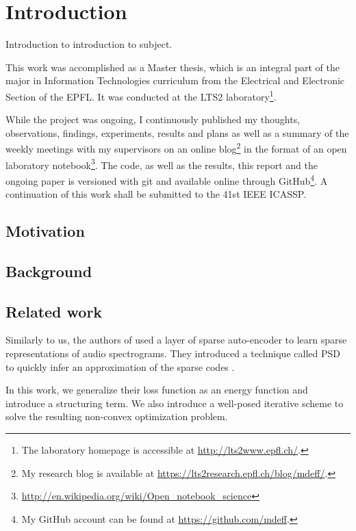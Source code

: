 \documentclass[a4paper,12pt,twoside]{report}
\begin{document}
\chapter*{Introduction}

{\color{red} Introduction to introduction to subject.}

This work was accomplished as a Master thesis, which is an integral part of the major in Information Technologies curriculum from the Electrical and Electronic Section of the \gls{EPFL}. It was conducted at the LTS2 laboratory\footnote{The laboratory homepage is accessible at \url{http://lts2www.epfl.ch/}.}.

While the project was ongoing, I continuously published my thoughts, observations, findings, experiments, results and plans as well as a summary of the weekly meetings with my supervisors on an online blog\footnote{My research blog is available at \url{https://lts2research.epfl.ch/blog/mdeff/}.} in the format of an open laboratory notebook\footnote{\url{http://en.wikipedia.org/wiki/Open_notebook_science}}. The code, as well as the results, this report and the ongoing paper is versioned with git and available online through GitHub\footnote{My GitHub account can be found at \url{https://github.com/mdeff}.}. A continuation of this work shall be submitted to the 41st IEEE \gls{ICASSP}.

\section*{Motivation}

\section*{Background}
\label{background}

\section*{Related work}

Similarly to us, the authors of \cite{lecun2011PSDaudio} used a layer of sparse auto-encoder to learn sparse representations of audio spectrograms. They introduced a technique called \gls{PSD} to quickly infer an approximation of the sparse codes \cite{lecun2010PSD}.

In this work, we generalize their loss function as an energy function and introduce a structuring term. We also introduce a well-posed iterative scheme to solve the resulting non-convex optimization problem.
\end{document}
